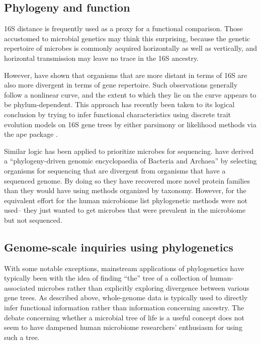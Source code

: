 \documentclass{amsart}
\begin{document}
\subsection{Phylogeny and function}

16S distance is frequently used as a proxy for a functional comparison.
Those accustomed to microbial genetics may think this surprising, because the genetic repertoire of microbes is commonly acquired horizontally as well as vertically, and horizontal transmission may leave no trace in the 16S ancestry.

However, \citep{zaneveld2010ribosomal} have shown that organisms that are more distant in terms of 16S are also more divergent in terms of gene repertoire.
Such observations generally follow a nonlinear curve, and the extent to which they lie on the curve appears to be phylum-dependent.
This approach has recently been taken to its logical conclusion by trying to infer functional characteristics using discrete trait evolution models on 16S gene trees \citep{langille2013predictive} by either parsimony \citep{kluge1969quantitative} or likelihood \citep{pagel1994detecting} methods via the ape package \citep{paradis2004ape}.

Similar logic has been applied to prioritize microbes for sequencing.
\citet{wu2009phylogeny} have derived a ``phylogeny-driven genomic encyclopaedia of Bacteria and Archaea'' by selecting organisms for sequencing that are divergent from organisms that have a sequenced genome.
By doing so they have recovered more novel protein families than they would have using methods organized by taxonomy.
However, for the equivalent effort for the human microbiome \citep{fodor2012most} list phylogenetic methods were not used-- they just wanted to get microbes that were prevalent in the microbiome but not sequenced.


\subsection{Genome-scale inquiries using phylogenetics}
With some notable exceptions, mainstream applications of phylogenetics have typically been with the idea of finding ``the'' tree of a collection of human-associated microbes rather than explicitly exploring divergence between various gene trees.
As described above, whole-genome data is typically used to directly infer functional information rather than information concerning ancestry.
The debate concerning whether a microbial tree of life is a useful concept does not seem to have dampened human microbiome researchers' enthusiasm for using such a tree.
\end{document}
